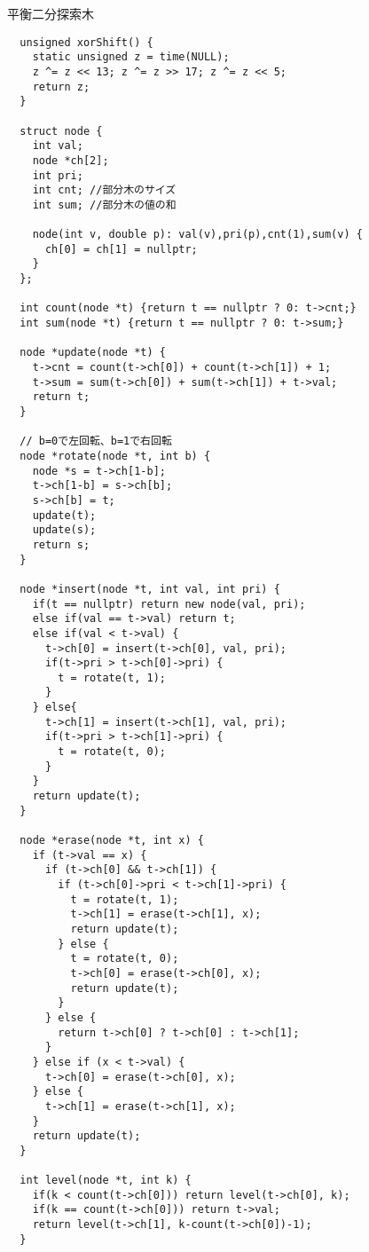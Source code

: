 \documentclass[11pt,a4paper]{jsarticle}
\begin{document}
平衡二分探索木
\begin{lstlisting}
  unsigned xorShift() {
  	static unsigned z = time(NULL);
  	z ^= z << 13; z ^= z >> 17; z ^= z << 5;
  	return z;
  }

  struct node {
    int val;
    node *ch[2];
    int pri;
    int cnt; //部分木のサイズ
    int sum; //部分木の値の和

    node(int v, double p): val(v),pri(p),cnt(1),sum(v) {
      ch[0] = ch[1] = nullptr;
    }
  };

  int count(node *t) {return t == nullptr ? 0: t->cnt;}
  int sum(node *t) {return t == nullptr ? 0: t->sum;}

  node *update(node *t) {
    t->cnt = count(t->ch[0]) + count(t->ch[1]) + 1;
    t->sum = sum(t->ch[0]) + sum(t->ch[1]) + t->val;
    return t;
  }

  // b=0で左回転、b=1で右回転
  node *rotate(node *t, int b) {
    node *s = t->ch[1-b];
    t->ch[1-b] = s->ch[b];
    s->ch[b] = t;
    update(t);
    update(s);
    return s;
  }

  node *insert(node *t, int val, int pri) {
    if(t == nullptr) return new node(val, pri);
    else if(val == t->val) return t;
    else if(val < t->val) {
      t->ch[0] = insert(t->ch[0], val, pri);
      if(t->pri > t->ch[0]->pri) {
        t = rotate(t, 1);
      }
    } else{
      t->ch[1] = insert(t->ch[1], val, pri);
      if(t->pri > t->ch[1]->pri) {
        t = rotate(t, 0);
      }
    }
    return update(t);
  }

  node *erase(node *t, int x) {
    if (t->val == x) {
      if (t->ch[0] && t->ch[1]) {
        if (t->ch[0]->pri < t->ch[1]->pri) {
          t = rotate(t, 1);
          t->ch[1] = erase(t->ch[1], x);
          return update(t);
        } else {
          t = rotate(t, 0);
          t->ch[0] = erase(t->ch[0], x);
          return update(t);
        }
      } else {
        return t->ch[0] ? t->ch[0] : t->ch[1];
      }
    } else if (x < t->val) {
      t->ch[0] = erase(t->ch[0], x);
    } else {
      t->ch[1] = erase(t->ch[1], x);
    }
    return update(t);
  }

  int level(node *t, int k) {
    if(k < count(t->ch[0])) return level(t->ch[0], k);
    if(k == count(t->ch[0])) return t->val;
    return level(t->ch[1], k-count(t->ch[0])-1);
  }
\end{lstlisting}
\end{document}
